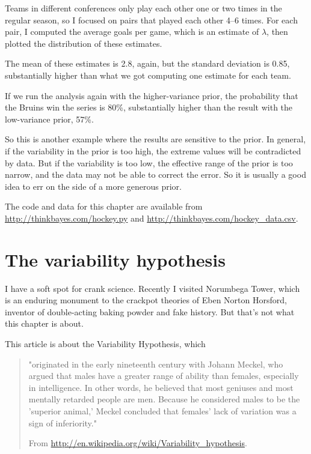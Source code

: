 \documentclass[12pt]{book}
\begin{document}
Teams in different conferences only play each other one or two
times in the regular season, so I focused on pairs that played
each other 4--6 times.  For each pair, I computed the average
goals per game, which is an estimate of $\lambda$, then plotted
the distribution of these estimates.

The mean of these estimates is 2.8, again, but the standard
deviation is 0.85, substantially higher than what we got computing
one estimate for each team.

If we run the analysis again with the higher-variance prior, the
probability that the Bruins win the series is 80\%, substantially
higher than the result with the low-variance prior, 57\%.

So this is another example where the results are sensitive to the
prior.  In general, if the variability in the prior is too high, the
extreme values will be contradicted by data.  But if the
variability is too low, the effective range of the prior is too
narrow, and the data may not be able to correct the error.  So it is
usually a good idea to err on the side of a more generous prior.

The code and data for this chapter are available from
\url{http://thinkbayes.com/hockey.py} and
\url{http://thinkbayes.com/hockey_data.csv}.


\chapter{The variability hypothesis}

I have a soft spot for crank science.  Recently I visited Norumbega
Tower, which is an enduring monument to the crackpot theories of Eben
Norton Horsford, inventor of double-acting baking powder and fake
history.  But that's not what this chapter is about.

This article is about the Variability Hypothesis, which

\begin{quote}
"originated in the early nineteenth century with Johann Meckel, who
  argued that males have a greater range of ability than females,
  especially in intelligence. In other words, he believed that most
  geniuses and most mentally retarded people are men. Because he
  considered males to be the 'superior animal,' Meckel concluded that
  females' lack of variation was a sign of inferiority."

From \url{http://en.wikipedia.org/wiki/Variability_hypothesis}.
\end{quote}
\end{document}
